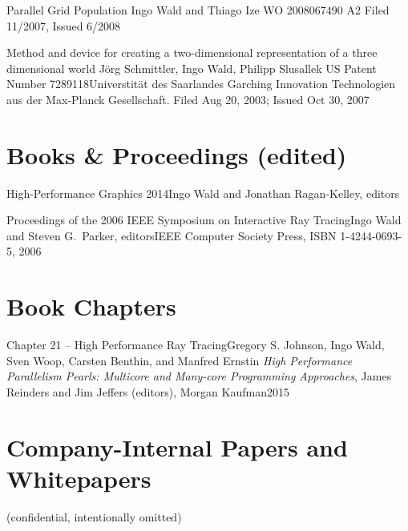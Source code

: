 \documentclass[letterpaper,11pt]{moderncv}
\begin{document}
\cvbibitem
{Parallel Grid Population}
{Ingo Wald and Thiago Ize}
{WO 2008067490 A2}
{Filed 11/2007, Issued 6/2008}

\cvbibitem
{Method and device for creating a two-dimensional representation of a three dimensional world}
{J\"org Schmittler, Ingo Wald, \und Philipp Slusallek}
{US Patent Number 7289118}{Universtit\"at des Saarlandes \und Garching Innovation Technologien
      aus der Max-Planck Gesellschaft. Filed Aug 20, 2003; Issued Oct 30, 2007}{}


\closesection
\medskip


\section{Books \& Proceedings (edited)}

\cvbibitem
{High-Performance Graphics 2014}{Ingo Wald and Jonathan Ragan-Kelley, editors}{}{}

\cvbibitem
{Proceedings of the 2006 IEEE Symposium on Interactive Ray
  Tracing}{Ingo Wald and Steven G.\ Parker, editors}{}{IEEE Computer Society Press, ISBN 1-4244-0693-5, 2006}


\closesection
\vspace{-1ex}


\section{Book Chapters}

\cvbibitem
{Chapter 21 -- High Performance Ray Tracing}{Gregory S. Johnson, Ingo Wald, Sven Woop, Carsten Benthin, and Manfred Ernst}{in \emph{High Performance Parallelism Pearls: Multicore and Many-core Programming Approaches}, James Reinders and Jim Jeffers (editors), Morgan Kaufman}{2015}

\closesection

\vspace{-1ex}
\section{Company-Internal Papers and Whitepapers}

  \cvbibitem 
    {(confidential, intentionally omitted)}
    {}
    {}{}

\vspace{-1ex}
\end{document}
